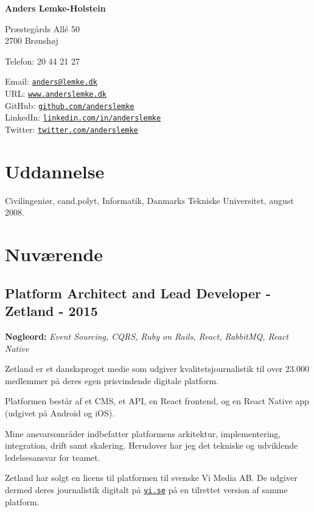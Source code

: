 \documentclass[a4paper]{article}
\newcommand{\keywords}[1]{\small\textbf{Nøgleord:} \emph{#1}\normalsize}
\begin{document}
{\huge\bf Anders Lemke-Holstein}

\bigskip
Præstegårds Allé 50 \\
2700 Brønshøj

\medskip

Telefon: 20 44 21 27

\medskip

Email: \href{mailto:anders@lemke.dk}{\tt anders@lemke.dk} \\
URL: \href{https://www.anderslemke.dk}{\tt www.anderslemke.dk} \\
GitHub: \href{https://www.github.com/anderslemke}{\tt github.com/anderslemke} \\
LinkedIn: \href{https://www.linkedin.com/in/anderslemke}{\tt linkedin.com/in/anderslemke} \\
Twitter: \href{https://www.twitter.com/anderslemke}{\tt twitter.com/anderslemke} 

\section*{Uddannelse}

Civilingeniør, cand.polyt, Informatik, Danmarks Tekniske Universitet, august 2008.

\section*{Nuværende}

\subsection*{Platform Architect and Lead Developer - Zetland - 2015}
\keywords{Event Sourcing, CQRS, Ruby on Rails, React, RabbitMQ, React Native}

Zetland er et dansksproget medie som udgiver kvalitetsjournalistik til over 23.000 medlemmer på deres egen prisvindende digitale platform.

Platformen består af et CMS, et API, en React frontend, og en React Native app (udgivet på Android og iOS).

Mine ansvarsområder indbefatter platformens arkitektur, implementering, integration, drift samt skalering. Herudover har jeg det tekniske og udviklende ledelsesansvar for teamet.

Zetland har solgt en licens til platformen til svenske Vi Media AB. De udgiver dermed deres journalistik digitalt på \href{https://vi.se}{\tt vi.se} på en tilrettet version af samme platform.
\end{document}
